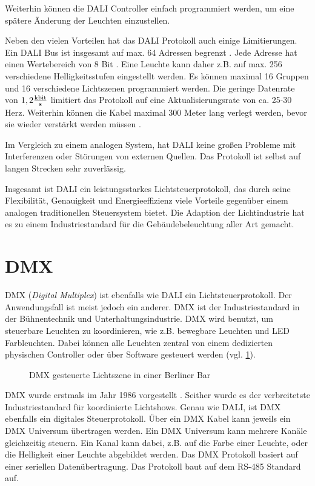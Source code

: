 Weiterhin können die DALI Controller einfach programmiert werden, um eine spätere Änderung der Leuchten einzustellen.

Neben den vielen Vorteilen hat das DALI Protokoll auch einige Limitierungen. Ein DALI Bus ist insgesamt auf max. 64 Adressen begrenzt \cite[S.7]{DALI_Handbuch}. Jede Adresse hat einen Wertebereich von 8 Bit \cite[S.1]{DALI-Lichtmanagement}. Eine Leuchte kann daher z.B. auf max. 256 verschiedene Helligkeitsstufen eingestellt werden. Es können maximal 16 Gruppen und 16 verschiedene Lichtszenen programmiert werden. Die geringe Datenrate von $1,2 \frac{\SI{}{\kilo\bit}}{\SI{}{\s}}$ limitiert das Protokoll auf eine Aktualisierungsrate von ca. 25-30 Herz. Weiterhin können die Kabel maximal 300 Meter lang verlegt werden, bevor sie wieder verstärkt werden müssen \cite[S.3]{DALI_Handbuch}. 

Im Vergleich zu einem analogen System, hat DALI keine großen Probleme mit Interferenzen oder Störungen von externen Quellen. Das Protokoll ist selbst auf langen Strecken sehr zuverlässig.

Insgesamt ist DALI ein leistungsstarkes Lichtsteuerprotokoll, das durch seine Flexibilität, Genauigkeit und Energieeffizienz viele Vorteile gegenüber einem analogen traditionellen Steuersystem bietet. Die Adaption der Lichtindustrie hat es zu einem Industriestandard für die Gebäudebeleuchtung aller Art gemacht.

\section{DMX}

DMX (\emph{Digital Multiplex}) ist ebenfalls wie DALI ein Lichtsteuerprotokoll. Der Anwendungsfall ist meist jedoch ein anderer. DMX ist der Industriestandard in der Bühnentechnik und Unterhaltungsindustrie. DMX wird benutzt, um steuerbare Leuchten zu koordinieren, wie z.B. bewegbare Leuchten und LED Farbleuchten. Dabei können alle Leuchten zentral von einem dedizierten physischen Controller oder über Software gesteuert werden (vgl. \ref{fig:dmx_use_example}).


\begin{figure}[H]
	\centering
	\caption{DMX gesteuerte Lichtszene in einer Berliner Bar}
	\label{fig:dmx_use_example}
\end{figure}


DMX wurde erstmals im Jahr 1986 vorgestellt \cite[S.5, ch. 2.1]{DMX101-Handbook}. Seither wurde es der verbreitetste Industriestandard für koordinierte Lichtshows. Genau wie DALI, ist DMX ebenfalls ein digitales Steuerprotokoll. Über ein DMX Kabel kann jeweils ein DMX Universum übertragen werden. Ein DMX Universum kann mehrere Kanäle gleichzeitig steuern. Ein Kanal kann dabei, z.B. auf die Farbe einer Leuchte, oder die Helligkeit einer Leuchte abgebildet werden. Das DMX Protokoll basiert auf einer seriellen Datenübertragung. Das Protokoll baut auf dem RS-485 Standard\cite[S.11, ch. 3.2]{DMX101-Handbook} auf.

